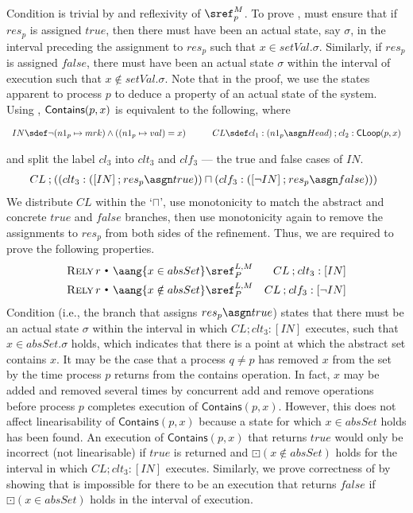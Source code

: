 \documentclass{article}
\newcommand{\AG}[1]{\aang{#1}}
\newcommand{\st}{~{\scriptscriptstyle ^\bullet}~}
\def \rely {\mathop{\textsc{Rely}}}
\theoremstyle{plain}
\theoremstyle{definition}
\newcommand{\Always}{\textstyle\mathord{\boxdot}}
\def\ch{\mathbin{;}}
\begin{document}
Condition  is trivial by  and
reflexivity of $\sref_p^{M}$. To prove , must ensure that
if $res_p$ is assigned $true$, then there must have been an actual
state, say $\sigma$, in the interval preceding the assignment to
$res_p$ such that $x \in setVal.\sigma$. Similarly, if $res_p$ is
assigned $false$, there must have been an actual state $\sigma$ within
the interval of execution such that $x \notin setVal.\sigma$. Note
that in the proof, we use the states apparent to process $p$ to deduce
a property of an actual state of the system. Using
, ${\sf Contains}(p,x)$ is equivalent to the
following, where\smallskip

\noindent
\quad
$\begin{array}{rcl}
IN \sdef   \neg (n1_p\mapsto mrk)
\land ((n1_p\mapsto val) = x) & \quad & 
CL \sdef cl_1: (n1_p \asgn Head)
\ch cl_2: {\sf CLoop}(p,x)
\end{array}$\hfill\smallskip

\noindent
and split the label $cl_3$ into $clt_3$ and $clf_3$ --- the true and
false cases of $IN$.
$$  \begin{array}[c]{@{}ll@{}}
CL
    \ch 
    \left ((clt_3: ([IN]
    \ch res_p \asgn true))
    \sqcap (clf_3:([\neg IN] \ch res_p \asgn false)) \right)
  \end{array}
$$
\noindent
We distribute $CL$ within the `$\sqcap$', use monotonicity to match
the abstract and concrete $true$ and $false$ branches, then use
monotonicity again to remove the assignments to $res_p$ from both
sides of the refinement. Thus, we are required to prove the following
properties.
\begin{eqnarray}
  \label{eq:4}
  \rely r \st \AG{x \in absSet}
  & 
  \sref_{P}^{L,M} & CL
  \ch clt_3:[IN]\\
  \label{eq:8}
  \rely r \st \AG{x \notin absSet}
  & 
  \sref_{P}^{L,M} & CL \ch clf_3:[\neg IN]\end{eqnarray}
Condition  (i.e., the branch that assigns $res_p \asgn
true$) states that there must be an actual state $\sigma$ within the
interval in which $CL \ch clt_3: [IN]$ executes, such that $x \in
absSet.\sigma$ holds, which indicates that there is a point at which
the abstract set contains $x$. It may be the case that a process $q
\neq p$ has removed $x$ from the set by the time process $p$ returns
from the contains operation. In fact, $x$ may be added and removed
several times by concurrent add and remove operations before process
$p$ completes execution of $\mathsf{Contains}(p,x)$. However, this
does not affect linearisability of $\mathsf{Contains}(p,x)$ because a
state for which $x \in absSet$ holds has been found.  An execution of
$\mathsf{Contains}(p,x)$ that returns $true$ would only be incorrect
(not linearisable) if $true$ is returned and $\Always (x \notin
absSet)$ holds for the interval in which $CL \ch clt_3:[IN]$
executes. Similarly, we prove correctness of  by showing
that is impossible for there to be an execution that returns $false$
if $\Always (x \in absSet)$ holds in the interval of execution.
\smallskip
\end{document}
